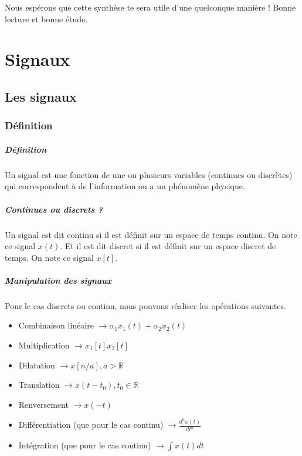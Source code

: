 \documentclass{report}
\begin{document}
Nous espérons que cette synthèse te sera utile d'une quelconque manière ! Bonne lecture et bonne étude.


\part{Signaux}

\chapter{Les signaux}
\section{Définition}
\subsubsection{Définition}
Un signal est une fonction de une ou plusieurs variables (continues ou discrètes) qui correspondent à de l'information ou a un phénomène physique.

\subsubsection{Continues ou discrets ?}
Un signal est dit continu si il est définit sur un espace de temps continu. On note ce signal $x(t)$. Et il est dit discret si il est définit sur un espace discret de temps. On note ce signal $x[t]$.

\subsubsection{Manipulation des signaux}
Pour le cas discrets ou continu, nous pouvons réaliser les opérations suivantes.
\begin{itemize}
\item Combinaison linéaire $\rightarrow \alpha_{1}x_{1}(t) + \alpha_{2}x_{2}(t)$
\item Multiplication $ \rightarrow x_{1}[t]x_{2}[t]$
\item Dilatation $ \rightarrow x[n/a], a > \mathbb{R}$
\item Translation $ \rightarrow x(t - t_0), t_0 \in \mathbb{R}$
\item Renversement $ \rightarrow x(-t)$
\item Différentiation (que pour le cas continu) $ \rightarrow \frac{d^n x(t)}{dt^n}$
\item Intégration (que pour le cas continu) $\rightarrow \int x(t) dt$
\end{itemize}
\end{document}
